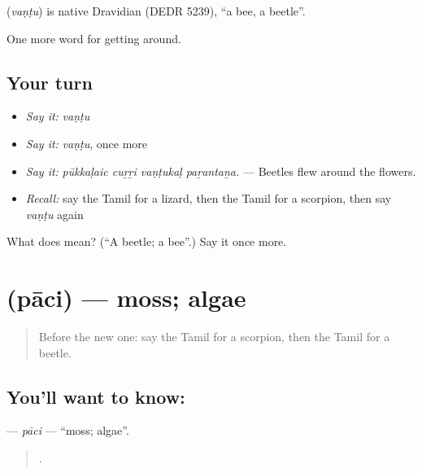 \begin{cousinweb}
\textbf{} (\emph{vaṇṭu}) is native Dravidian (DEDR 5239), \textquotedblleft{}a bee, a beetle\textquotedblright{}.
\end{cousinweb}

\begin{grammarlens}[title={What you've built}]
One more word for getting around.
\end{grammarlens}

\subsection*{Your turn}
\begin{itemize}
\raggedright
  \item \emph{Say it:} \emph{vaṇṭu}
  \item \emph{Say it:} \emph{vaṇṭu}, once more
  \item \emph{Say it:} \emph{pūkkaḷaic cuṟṟi vaṇṭukaḷ paṟantaṉa.} — Beetles flew around the flowers.
  \item \emph{Recall:} say the Tamil for a lizard, then the Tamil for a scorpion, then say \emph{vaṇṭu} again
\end{itemize}

\begin{tcolorbox}[breakable,colback=teal!4,colframe=teal!35!black,title={Before you move on}]
What does  mean? (\textquotedblleft{}A beetle; a bee\textquotedblright{}.) Say it once more.
\end{tcolorbox}
\section[\texorpdfstring{\ta{பாசி} (pāci)}{பாசி (pāci)}]{ (pāci) — moss; algae}

\label{lesson:TA-C439-paci}



\begin{quote}
Before the new one: say the Tamil for a scorpion, then the Tamil for a beetle.
\end{quote}

\subsection*{You'll want to know: }
\textbf{} — \emph{pāci} — \textquotedblleft{}moss; algae\textquotedblright{}.

\begin{quote}
    .
\end{quote}

